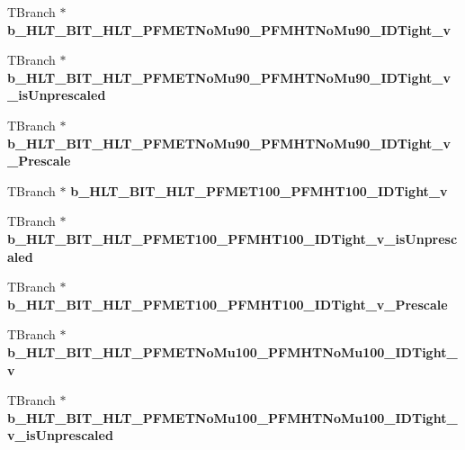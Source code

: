 \begin{DoxyCompactItemize}
T\+Branch $\ast$ {\bfseries b\+\_\+\+H\+L\+T\+\_\+\+B\+I\+T\+\_\+\+H\+L\+T\+\_\+\+P\+F\+M\+E\+T\+No\+Mu90\+\_\+\+P\+F\+M\+H\+T\+No\+Mu90\+\_\+\+I\+D\+Tight\+\_\+v}
\item 
\hypertarget{classMiniTree_aa899fe41c356c5e103f38b0f6f37444a}{}\label{classMiniTree_aa899fe41c356c5e103f38b0f6f37444a} 
T\+Branch $\ast$ {\bfseries b\+\_\+\+H\+L\+T\+\_\+\+B\+I\+T\+\_\+\+H\+L\+T\+\_\+\+P\+F\+M\+E\+T\+No\+Mu90\+\_\+\+P\+F\+M\+H\+T\+No\+Mu90\+\_\+\+I\+D\+Tight\+\_\+v\+\_\+is\+Unprescaled}
\item 
\hypertarget{classMiniTree_ad82046b84ac36a7a3ca931265e614b45}{}\label{classMiniTree_ad82046b84ac36a7a3ca931265e614b45} 
T\+Branch $\ast$ {\bfseries b\+\_\+\+H\+L\+T\+\_\+\+B\+I\+T\+\_\+\+H\+L\+T\+\_\+\+P\+F\+M\+E\+T\+No\+Mu90\+\_\+\+P\+F\+M\+H\+T\+No\+Mu90\+\_\+\+I\+D\+Tight\+\_\+v\+\_\+\+Prescale}
\item 
\hypertarget{classMiniTree_ab0d0a70deb1cef3adf40dae74192bb4a}{}\label{classMiniTree_ab0d0a70deb1cef3adf40dae74192bb4a} 
T\+Branch $\ast$ {\bfseries b\+\_\+\+H\+L\+T\+\_\+\+B\+I\+T\+\_\+\+H\+L\+T\+\_\+\+P\+F\+M\+E\+T100\+\_\+\+P\+F\+M\+H\+T100\+\_\+\+I\+D\+Tight\+\_\+v}
\item 
\hypertarget{classMiniTree_a265b8b6b6a39b33c397ad2c79b6522ca}{}\label{classMiniTree_a265b8b6b6a39b33c397ad2c79b6522ca} 
T\+Branch $\ast$ {\bfseries b\+\_\+\+H\+L\+T\+\_\+\+B\+I\+T\+\_\+\+H\+L\+T\+\_\+\+P\+F\+M\+E\+T100\+\_\+\+P\+F\+M\+H\+T100\+\_\+\+I\+D\+Tight\+\_\+v\+\_\+is\+Unprescaled}
\item 
\hypertarget{classMiniTree_a1a01416f4f22fe896ee7ee18ed7e536d}{}\label{classMiniTree_a1a01416f4f22fe896ee7ee18ed7e536d} 
T\+Branch $\ast$ {\bfseries b\+\_\+\+H\+L\+T\+\_\+\+B\+I\+T\+\_\+\+H\+L\+T\+\_\+\+P\+F\+M\+E\+T100\+\_\+\+P\+F\+M\+H\+T100\+\_\+\+I\+D\+Tight\+\_\+v\+\_\+\+Prescale}
\item 
\hypertarget{classMiniTree_a28f001c38934dc0b5e6053d7e4beacce}{}\label{classMiniTree_a28f001c38934dc0b5e6053d7e4beacce} 
T\+Branch $\ast$ {\bfseries b\+\_\+\+H\+L\+T\+\_\+\+B\+I\+T\+\_\+\+H\+L\+T\+\_\+\+P\+F\+M\+E\+T\+No\+Mu100\+\_\+\+P\+F\+M\+H\+T\+No\+Mu100\+\_\+\+I\+D\+Tight\+\_\+v}
\item 
\hypertarget{classMiniTree_a3ecdc2f115f2892ec4dd763933e8abfc}{}\label{classMiniTree_a3ecdc2f115f2892ec4dd763933e8abfc} 
T\+Branch $\ast$ {\bfseries b\+\_\+\+H\+L\+T\+\_\+\+B\+I\+T\+\_\+\+H\+L\+T\+\_\+\+P\+F\+M\+E\+T\+No\+Mu100\+\_\+\+P\+F\+M\+H\+T\+No\+Mu100\+\_\+\+I\+D\+Tight\+\_\+v\+\_\+is\+Unprescaled}
\item 
\hypertarget{classMiniTree_a1a558865cc7bb4404b4bbf87e9123d8b}{}\label{classMiniTree_a1a558865cc7bb4404b4bbf87e9123d8b} 

\end{DoxyCompactItemize}
